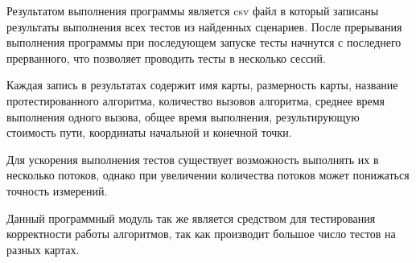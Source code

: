 Результатом выполнения программы является csv файл в который записаны результаты выполнения всех тестов из найденных сценариев. После прерывания выполнения программы при последующем запуске тесты начнутся с последнего прерванного, что позволяет проводить тесты в несколько сессий.

Каждая запись в результатах содержит имя карты, размерность карты, название протестированного алгоритма, количество вызовов алгоритма, среднее время выполнения одного вызова, общее время выполнения, результирующую стоимость пути, координаты начальной и конечной точки.  

Для ускорения выполнения тестов существует возможность выполнять их в несколько потоков, однако при увеличении количества потоков может понижаться точность измерений.

Данный программный модуль так же является средством для тестирования корректности работы алгоритмов, так как производит большое число тестов на разных картах.